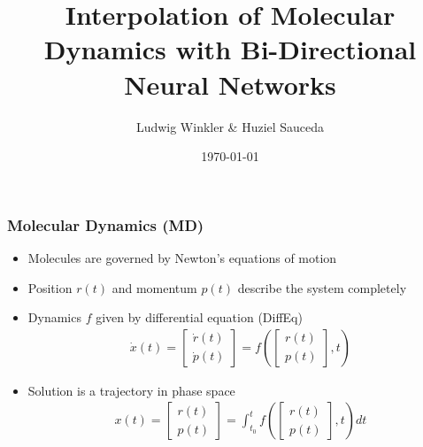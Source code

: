 \documentclass[usenames, dvipsnames, t]{beamer}
\title[Interpolation of MD with Bi-Directional NN]{Interpolation of Molecular Dynamics with Bi-Directional Neural Networks}
\subtitle{}
\author[Winkler \& Sauceda]{Ludwig Winkler \& Huziel Sauceda}
\date{\today}
\begin{document}
\def\mathn#1{\mathnormal{#1}}
\def\thet{\bm{\theta}}
\def\V{\mathn{V}}
\def\Q{\mathn{Q}}
\def\R{\mathn{R}}
\def\r{\mathn{r}}
\def\G{\mathn{G}}
\def\n{\mathn{n}}
\def\A{\mathn{A}}
\def\T{\mathn{T}}
\def\W{\mathn{W}}

\def\w{\mathn{w}}
\def\p{\mathn{p}}
\def\q{\mathn{q}}
\def\a{\mathn{a}}
\def\r{\mathn{r}}
\def\s{\mathn{s}}
\def\t{\mathn{t}}
\def\dist{1}

\newcommand{\E}{\mathbb{E}}



\begin{frame}
	\titlepage
\end{frame}


\begin{frame}
	\frametitle{Molecular Dynamics (MD)}
	\begin{itemize}
		\item<+-> Molecules are governed by Newton's equations of motion 
		\item<+-> Position $r(t)$ and momentum $p(t)$ describe the system completely
		\item<+-> Dynamics $f$ given by differential equation (DiffEq)
		\begin{align*}
			\dot{x}(t) =
			\begin{bmatrix}
				\dot{r}(t) \\ 
				\dot{p}(t)
			\end{bmatrix}
			= f \left(
			\begin{bmatrix}
				r(t) \\ 
				p(t)
			\end{bmatrix}
			,t
			\right)
		\end{align*}
		\onslide<+->
		\item Solution is a trajectory in phase space
		\begin{align*}
			x(t) = 
			\begin{bmatrix}
				r(t) \\ 
				p(t)
			\end{bmatrix}
			= 
			\int_{t_0}^t f \left( \begin{bmatrix} r(t) \\ p(t) \end{bmatrix} ,t \right) dt
		\end{align*}
	\end{itemize}
\end{frame}
\end{document}
